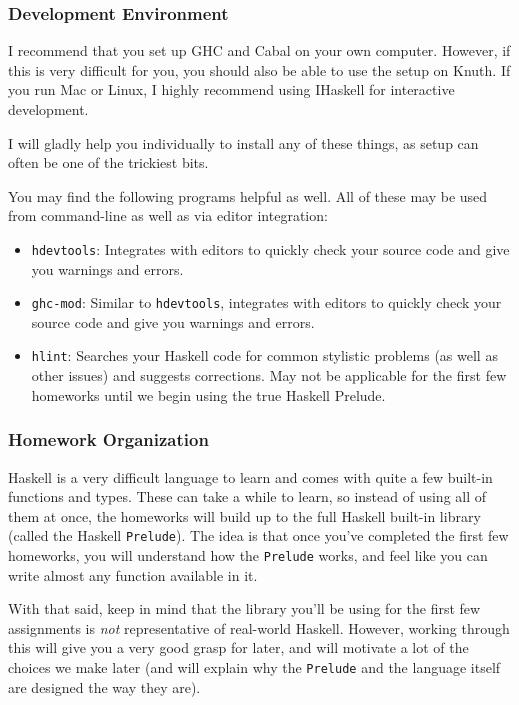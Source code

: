 \documentclass{article}
\begin{document}
\subsubsection*{Development Environment}

I recommend that you set up GHC and Cabal on your own computer. However, if this is very difficult
for you, you should also be able to use the setup on Knuth. If you run Mac or Linux, I highly
recommend using IHaskell for interactive development.

I will gladly help you individually to install any of these things, as setup can often be one of the
trickiest bits.

You may find the following programs helpful as well. All of these may be used from command-line as
well as via editor integration:
\begin{itemize}
    \item \texttt{hdevtools}: Integrates with editors to quickly check your source code and give you
        warnings and errors.
    \item \texttt{ghc-mod}: Similar to \texttt{hdevtools}, integrates with editors to quickly check your source code and give you
        warnings and errors.
    \item \texttt{hlint}: Searches your Haskell code for common stylistic problems (as well as other
        issues) and suggests corrections. May not be applicable for the first few homeworks until we
        begin using the true Haskell Prelude.
\end{itemize}

\subsubsection*{Homework Organization}

Haskell is a very difficult language to learn and comes with quite a few built-in functions and
types. These can take a while to learn, so instead of using all of them at once, the homeworks will
build up to the full Haskell built-in library (called the Haskell \texttt{Prelude}). The idea is
that once you've completed the first few homeworks, you will understand how the \texttt{Prelude}
works, and feel like you can write almost any function available in it.

With that said, keep in mind that the library you'll be using for the first few assignments is
\emph{not} representative of real-world Haskell. However, working through this will give you a very
good grasp for later, and will motivate a lot of the choices we make later (and will explain why the
\texttt{Prelude} and the language itself are designed the way they are).
\end{document}
